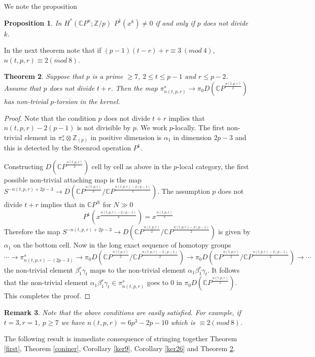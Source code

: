 \documentclass[a4paper,leqno,12pt]{amsart}
\theoremstyle{plain}
\newtheorem{theorem}{Theorem}[section]
\newtheorem{prop}[theorem]{Proposition}
\newtheorem{remark}[theorem]{Remark}
\theoremstyle{definition}
\numberwithin{equation}{section}
\begin{document}
We note the proposition 

\begin{prop}
In $H^*({\mathbb{C}} P^n; {\mathbb{Z}}/p)$ $P^1(x^k) \neq 0$ if and only if $p$ does not divide $k$. 
\end{prop}

In the next theorem note that if $(p-1)(t-r) + r \equiv 3~(\mathit{mod}~4)$, $n(t,p,r) \equiv 2(\mathit{mod}~8)$. 
\begin{theorem}\label{mainhigh}
Suppose that $p$ is a prime $\geq 7$, $2\leq t \leq p-1$ and $r\leq p-2$. Assume that $p$ does not divide $t+r$. Then the map $\pi_{n(t,p,r)}^s \to \pi_0 D({\mathbb{C}} P^\frac{n(t,p,r)}{2})$ has non-trivial $p$-torsion in the kernel. 
\end{theorem}

\begin{proof}
Note that the condition $p$ does not divide $t+r$ implies that $n(t,p,r)- 2(p-1)$ is not divisible by $p$. We work $p$-locally. The first non-trivial element in $\pi_*^s \otimes {\mathbb{Z}}_{(p)}$ in positive dimension is $\alpha_1$ in dimension $2p-3$ and this is detected by the Steenrod operation $P^1$. 

Constructing $D({\mathbb{C}} P^\frac{n(t,p,r)}{2})$ cell by cell as above in the $p$-local category, the first possible non-trivial attaching map is the map $S^{-n(t,p,r) +2p-3} \to  D({\mathbb{C}} P^\frac{n(t,p,r)}{2}/{\mathbb{C}} P^\frac{n(t,p,r) - 2(p-1)}{2})$. The assumption $p$ does not divide $t+r$ implies that in ${\mathbb{C}} P^N$ for $N\gg 0$
$$P^1(x^\frac{n(t,p,r)-2(p-1)}{2}) = x^\frac{n(t,p,r)}{2}$$
Therefore the map $S^{-n(t,p,r) +2p-3} \to  D({\mathbb{C}} P^\frac{n(t,p,r)}{2}/{\mathbb{C}} P^\frac{n(t,p,r) - 2(p-1)}{2})$ is given by $\alpha_1$ on the bottom cell. Now in the long exact sequence of homotopy groups
$$\cdots \to \pi_{n(t,p,r)-(2p-3)}^s \to \pi_0 D({\mathbb{C}} P^\frac{n(t,p,r)}{2}/{\mathbb{C}} P^\frac{n(t,p,r) - 2(p-1)}{2}) \to \pi_0 D({\mathbb{C}} P^\frac{n(t,p,r)}{2}/{\mathbb{C}} P^\frac{n(t,p,r) - 2(p-1)}{2})\to \cdots $$
the non-trivial element $\beta_1^r\gamma_t$ maps to the non-trivial element $\alpha_1 \beta_1^r\gamma_t$.  It follows that the non-trivial element $\alpha_1\beta_1^r\gamma_t \in \pi_{n(t,p,r)}^s $ goes to $0$ in $\pi_0 D({\mathbb{C}} P^\frac{n(t,p,r)}{2})$. This completes the proof. 
\end{proof}

\begin{remark}
Note that the above conditions are easily satisfied. For example, if $t=3,r=1$, $p\geq 7$ we have $n(t,p,r)= 6p^3 - 2p -10$ which is $\equiv 2 (\mathit{mod}~8)$.
\end{remark}
The following result is immediate consequence of stringing together Theorem \ref{first}, Theorem \ref{coniner}, Corollary \ref{ker9}, Corollary \ref{ker26} and Theorem \ref{mainhigh}.
\end{document}
